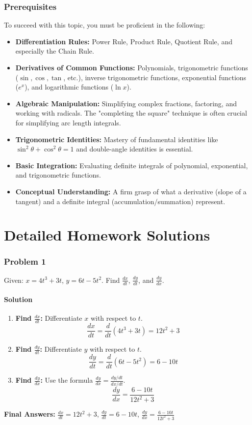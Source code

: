 \documentclass{article}
\begin{document}
\section{Prerequisites}
To succeed with this topic, you must be proficient in the following:
\begin{itemize}
    \item \textbf{Differentiation Rules:} Power Rule, Product Rule, Quotient Rule, and especially the Chain Rule.
    \item \textbf{Derivatives of Common Functions:} Polynomials, trigonometric functions ($\sin, \cos, \tan$, etc.), inverse trigonometric functions, exponential functions ($e^x$), and logarithmic functions ($\ln x$).
    \item \textbf{Algebraic Manipulation:} Simplifying complex fractions, factoring, and working with radicals. The "completing the square" technique is often crucial for simplifying arc length integrals.
    \item \textbf{Trigonometric Identities:} Mastery of fundamental identities like $\sin^2\theta + \cos^2\theta = 1$ and double-angle identities is essential.
    \item \textbf{Basic Integration:} Evaluating definite integrals of polynomial, exponential, and trigonometric functions.
    \item \textbf{Conceptual Understanding:} A firm grasp of what a derivative (slope of a tangent) and a definite integral (accumulation/summation) represent.
\end{itemize}

\part{Detailed Homework Solutions}

\section{Problem 1}
Given: $x = 4t^3 + 3t$, $y = 6t - 5t^2$. Find $\frac{dx}{dt}$, $\frac{dy}{dt}$, and $\frac{dy}{dx}$.

\subsection*{Solution}
\begin{enumerate}
    \item \textbf{Find $\frac{dx}{dt}$:} Differentiate $x$ with respect to $t$.
    \[ \frac{dx}{dt} = \frac{d}{dt}(4t^3 + 3t) = 12t^2 + 3 \]
    \item \textbf{Find $\frac{dy}{dt}$:} Differentiate $y$ with respect to $t$.
    \[ \frac{dy}{dt} = \frac{d}{dt}(6t - 5t^2) = 6 - 10t \]
    \item \textbf{Find $\frac{dy}{dx}$:} Use the formula $\frac{dy}{dx} = \frac{dy/dt}{dx/dt}$.
    \[ \frac{dy}{dx} = \frac{6 - 10t}{12t^2 + 3} \]
\end{enumerate}
\textbf{Final Answers:}
$\frac{dx}{dt} = 12t^2 + 3$,
$\frac{dy}{dt} = 6 - 10t$,
$\frac{dy}{dx} = \frac{6 - 10t}{12t^2 + 3}$
\end{document}
